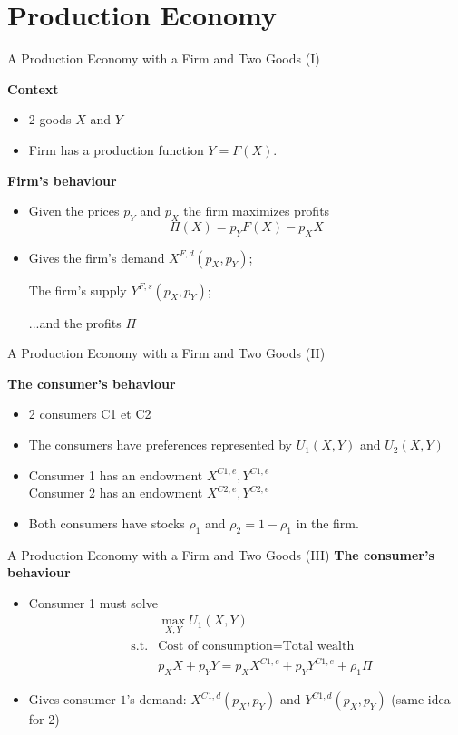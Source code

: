 \documentclass[handout]{beamer}
\newenvironment{iPar}[1]{\textbf{#1} \begin{itemize}}{\end{itemize}}
\newcommand{\mdp}{\medskip \pause}
\begin{document}
\section{Production Economy}

\begin{frame}{A Production Economy with a Firm and Two Goods (I)}

\begin{iPar}{Context} \item 2 goods $X$ and $Y$  \item Firm has a production function $Y = F(X)$.\end{iPar}\mdp

\begin{iPar}{Firm's behaviour}\item Given the prices $p_Y$ and $p_X$ the firm maximizes profits $$\Pi(X) = p_Y F(X) - p_X X$$   \item Gives the firm's demand $X^{F,d}(p_X,p_Y)$; \smallskip

The firm's supply
$Y^{F,s}(p_X,p_Y)$;\smallskip

...and the profits $\Pi$ \end{iPar} 
 
\end{frame}

\begin{frame}{A Production Economy with a Firm and Two Goods (II)}

\begin{iPar}{The consumer's behaviour} \item 2 consumers C1 et C2
 \item The consumers have preferences represented by
$U_1(X, Y)$ and $U_2(X,Y)$ \item Consumer 1 has an {endowment} $X^{C1,e},
Y^{C1,e}$ \\ \medskip Consumer 2 has an {endowment} $X^{C2,e}, Y^{C2,e}$
\item Both consumers have stocks $\rho_{1}$ and $\rho_2 = 1- \rho_1$ in the firm.
\end{iPar}
\end{frame}


\begin{frame}{A Production Economy with a Firm and Two Goods (III)}
\begin{iPar}{The consumer's behaviour} \item Consumer 1 must solve
\begin{eqnarray*} &&\max_{X,Y} U_1(X,Y) \\ &\textrm{s.t.} &\textrm{Cost of consumption} = \textrm{Total wealth} \\ &&  p_{X} X +  p_{Y}Y = p_{X}
X^{C1,e}+ p_{Y}Y^{C1,e} + \rho_{1}\Pi\end{eqnarray*} \item Gives consumer $1$'s demand:  $X^{C1,d}(p_X,p_Y)$ and
$Y^{C1,d}(p_X,p_Y)$ (same idea for 2) \end{iPar} \end{frame}
\end{document}
